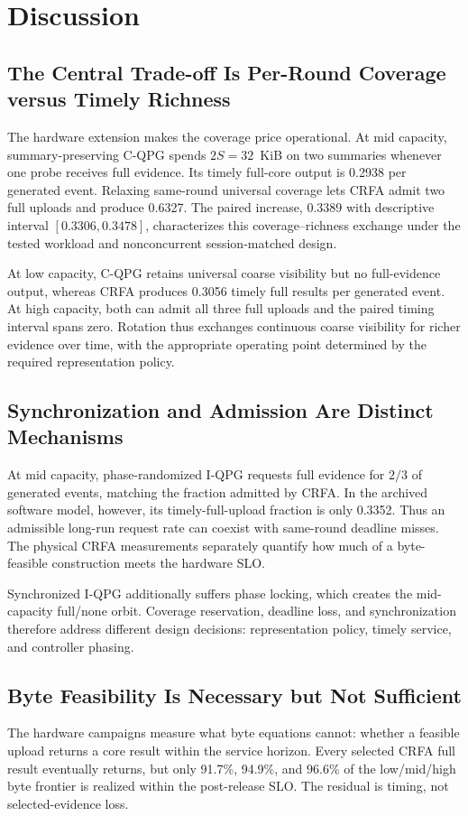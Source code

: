 \documentclass[10pt,journal]{IEEEtran}
\newcommand{\CRFA}{\textsc{CRFA}}
\begin{document}
\section{Discussion}
\label{sec:discussion}

\subsection{The Central Trade-off Is Per-Round Coverage versus Timely Richness}
The hardware extension makes the coverage price operational. At mid capacity,
summary-preserving C-QPG spends $2S=32$~KiB on two summaries whenever one
probe receives full evidence. Its timely full-core output is 0.2938 per
generated event. Relaxing same-round universal coverage lets \CRFA{} admit
two full uploads and produce 0.6327. The paired increase, 0.3389 with
descriptive interval $[0.3306,0.3478]$, characterizes this coverage--richness
exchange under the tested workload and nonconcurrent session-matched design.

At low capacity, C-QPG retains universal coarse visibility but no full-evidence
output, whereas \CRFA{} produces 0.3056 timely full results per generated
event. At high capacity, both can admit all three full uploads and the paired
timing interval spans zero. Rotation thus exchanges continuous coarse
visibility for richer evidence over time, with the appropriate operating
point determined by the required representation policy.

\subsection{Synchronization and Admission Are Distinct Mechanisms}
At mid capacity, phase-randomized I-QPG requests full evidence for $2/3$ of
generated events, matching the fraction admitted by \CRFA{}. In the archived
software model, however, its timely-full-upload fraction is only
0.3352. Thus an admissible long-run request rate can coexist with
same-round deadline misses. The physical \CRFA{} measurements separately
quantify how much of a byte-feasible construction meets the hardware SLO.

Synchronized I-QPG additionally suffers phase locking, which creates the
mid-capacity full/none orbit. Coverage reservation, deadline loss, and
synchronization therefore address different design decisions: representation
policy, timely service, and controller phasing.

\subsection{Byte Feasibility Is Necessary but Not Sufficient}
The hardware campaigns measure what byte equations cannot: whether a feasible
upload returns a core result within the service horizon. Every selected
\CRFA{} full result eventually returns, but only 91.7\%, 94.9\%, and 96.6\%
of the low/mid/high byte frontier is realized within the post-release SLO.
The residual is timing, not selected-evidence loss.
\end{document}
